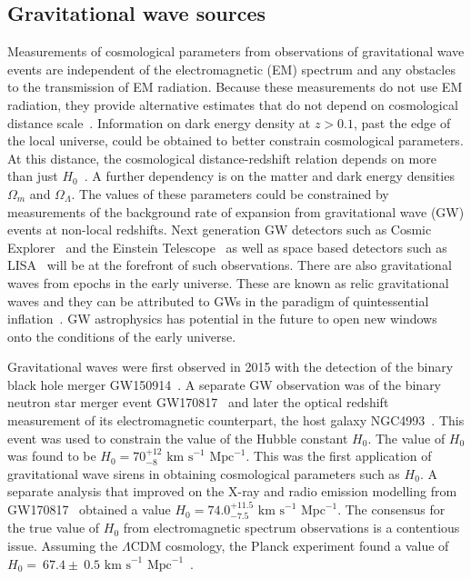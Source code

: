 \documentclass[twocolumn]{article}
\numberwithin{equation}{section}
\begin{document}
\subsection{Gravitational wave sources} %
Measurements of cosmological parameters from observations of gravitational wave events are independent of the electromagnetic (EM) spectrum and any obstacles to the transmission of EM radiation. Because these measurements do not use EM radiation, they provide alternative estimates that do not depend on cosmological distance scale~\cite{gw_distance_scale}. Information on dark energy density at $z>0.1$, past the edge of the local universe, could be obtained to better constrain cosmological parameters. At this distance, the cosmological distance-redshift relation depends on more than just $H_0$~\cite{gw_cosmology}. A further dependency is on the matter and dark energy densities $\Omega_m$ and $\Omega_\Lambda$. The values of these parameters could be constrained by measurements of the background rate of expansion from gravitational wave (GW) events at non-local redshifts. Next generation GW detectors such as Cosmic Explorer~\cite{cosmic_explorer} and the Einstein Telescope~\cite{einstein_telescope} as well as space based detectors such as LISA~\cite{lisa} will be at the forefront of such observations.
There are also gravitational waves from epochs in the early universe. These are known as relic gravitational waves and they can be attributed to GWs in the paradigm of quintessential inflation~\cite{relic_gws}. GW astrophysics has potential in the future to open new windows onto the conditions of the early universe.

Gravitational waves were first observed in 2015 with the detection of the binary black hole merger GW150914~\cite{gw_detection}. A separate GW observation was of the binary neutron star merger event GW170817~\cite{GW170817} and later the optical redshift measurement of its electromagnetic counterpart, the host galaxy NGC4993~\cite{em_counterpart1, em_counterpart2}. This event was used to constrain the value of the Hubble constant $H_0$. The value of $H_0$ was found to be $H_0 = 70^{+12}_{-8}\text{ km s}^{-1} \text{ Mpc}^{-1}$. This was the first application of gravitational wave sirens in obtaining cosmological parameters such as $H_0$. A separate analysis that improved on the X-ray and radio emission modelling from GW170817~\cite{GW170817_m2} obtained a value $H_0 = 74.0^{+11.5}_{-7.5}\text{ km s}^{-1} \text{ Mpc}^{-1}$. The consensus for the true value of $H_0$ from electromagnetic spectrum observations is a contentious issue. Assuming the $\Lambda \text{CDM}$ cosmology, the Planck experiment found a value of $H_0 =~ 67.4 \pm~0.5 \text{ km s}^{-1} \text{ Mpc}^{-1}$~\cite{planck}. 
\end{document}
